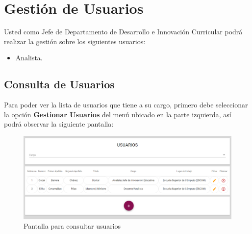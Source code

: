 
\section{Gestión de Usuarios}

    Usted como Jefe de Departamento de Desarrollo e Innovación Curricular podrá realizar la gestión sobre los siguientes usuarios:
    \begin{itemize}
        \item Analista.
    \end{itemize}


    \subsection{Consulta de Usuarios}

        Para poder ver la lista de usuarios que tiene a su cargo, primero debe seleccionar la opción \textbf{Gestionar Usuarios} del menú ubicado en la parte izquierda, así podrá observar la siguiente pantalla:

        \begin{figure}[!hbtp]
            \centering
            \hypertarget{consultarUs}{\includegraphics[width=0.7\linewidth]{images/SP5/Consultar-Usuario}}
            \caption{Pantalla para consultar usuarios}
            \label{consultarrh}
        \end{figure}

